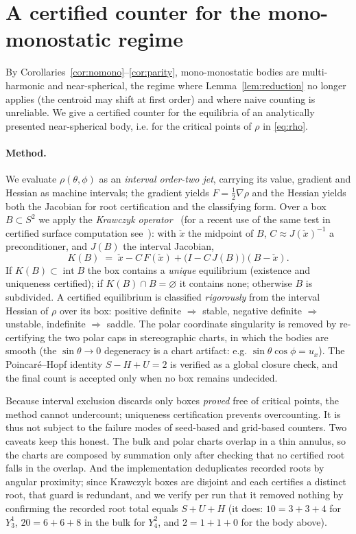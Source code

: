 \documentclass[11pt,a4paper]{article}
\theoremstyle{definition}
\begin{document}
\section{A certified counter for the mono-monostatic regime}\label{sec:certified}

By Corollaries~\ref{cor:nomono}--\ref{cor:parity}, mono-monostatic bodies are multi-harmonic and
near-spherical, the regime where Lemma~\ref{lem:reduction} no longer applies (the centroid may shift at first
order) and where naive counting is unreliable. We give a certified counter for the equilibria of an
analytically presented near-spherical body, i.e. for the critical points of $\rho$ in \eqref{eq:rho}.

\paragraph{Method.} We evaluate $\rho(\theta,\phi)$ as an \emph{interval order-two jet}, carrying its value,
gradient and Hessian as machine intervals; the gradient yields $F=\tfrac12\nabla\rho$ and the Hessian yields
both the Jacobian for root certification and the classifying form. Over a box $B\subset S^2$ we apply the
\emph{Krawczyk operator}~\cite{neumaier} (for a recent use of the same test in certified surface computation
see~\cite{krawczyksurf}): with $\check{x}$ the midpoint of $B$, $C\approx J(\check{x})^{-1}$ a preconditioner,
and $J(B)$ the interval Jacobian,
\[
K(B) \;=\; \check{x} - C\,F(\check{x}) + \big(I - C\,J(B)\big)(B-\check{x}).
\]
If $K(B)\subset\operatorname{int}B$ the box contains a \emph{unique} equilibrium (existence and uniqueness
certified); if $K(B)\cap B=\varnothing$ it contains none; otherwise $B$ is subdivided. A certified
equilibrium is classified \emph{rigorously} from the interval Hessian of $\rho$ over its box: positive
definite $\Rightarrow$ stable, negative definite $\Rightarrow$ unstable, indefinite $\Rightarrow$ saddle. The
polar coordinate singularity is removed by re-certifying the two polar caps in stereographic charts, in which
the bodies are smooth (the $\sin\theta\to0$ degeneracy is a chart artifact: e.g. $\sin\theta\cos\phi=u_x$). The
Poincar\'e--Hopf identity $S-H+U=2$ is verified as a global closure check, and the final count is accepted only
when no box remains undecided.

Because interval exclusion discards only boxes \emph{proved} free of critical points, the method cannot
undercount; uniqueness certification prevents overcounting. It is thus not subject to the failure modes of
seed-based and grid-based counters. Two caveats keep this honest. The bulk and polar charts overlap in a thin
annulus, so the charts are composed by summation only after checking that no certified root falls in the
overlap. And the implementation deduplicates recorded roots by angular proximity; since Krawczyk boxes are
disjoint and each certifies a distinct root, that guard is redundant, and we verify per run that it removed
nothing by confirming the recorded root total equals $S+U+H$ (it does: $10=3+3+4$ for $Y_3^1$, $20=6+6+8$ in
the bulk for $Y_4^2$, and $2=1+1+0$ for the body above).
\end{document}
